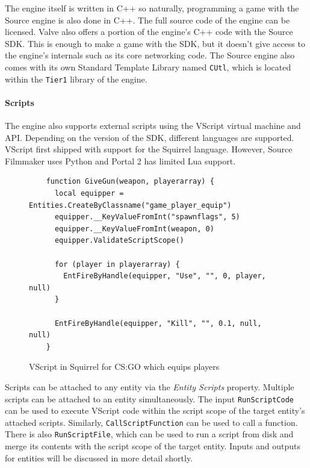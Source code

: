 \documentclass[a4paper, 12pt]{scrartcl}
\begin{document}
The engine itself is written in C++ so naturally, programming a game with the Source engine is also done in C++. The full source code of the engine can be licensed. Valve also offers a portion of the engine's C++ code with the Source SDK. This is enough to make a game with the SDK, but it doesn't give access to the engine's internals such as its core networking code. The Source engine also comes with its own Standard Template Library named \texttt{CUtl}, which is located within the \texttt{Tier1} library of the engine.

\paragraph{Scripts}
The engine also supports external scripts using the VScript virtual machine and API. Depending on the version of the SDK, different languages are supported. VScript first shipped with support for the Squirrel language. However, Source Filmmaker uses Python and Portal 2 has limited Lua support.

\begin{figure}[!htb]
  \begin{verbatim}
    function GiveGun(weapon, playerarray) {
      local equipper = Entities.CreateByClassname("game_player_equip")
      equipper.__KeyValueFromInt("spawnflags", 5)
      equipper.__KeyValueFromInt(weapon, 0)
      equipper.ValidateScriptScope()

      for (player in playerarray) {
        EntFireByHandle(equipper, "Use", "", 0, player, null)
      }

      EntFireByHandle(equipper, "Kill", "", 0.1, null, null)
    }
  \end{verbatim}
  \caption{VScript in Squirrel for CS:GO which equips players}
  \label{fig:source_vscript}
\end{figure}

Scripts can be attached to any entity via the \textit{Entity Scripts} property. Multiple scripts can be attached to an entity simultaneously. The input \texttt{RunScriptCode} can be used to execute VScript code within the script scope of the target entity's attached scripts. Similarly, \texttt{CallScriptFunction} can be used to call a function. There is also \texttt{RunScriptFile}, which can be used to run a script from disk and merge its contents with the script scope of the target entity. Inputs and outputs for entities will be discussed in more detail shortly.
\end{document}
